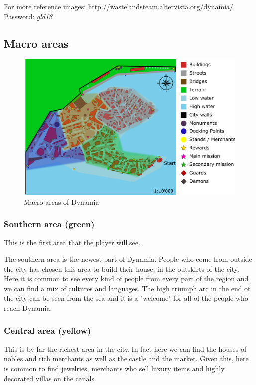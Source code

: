 For more reference images: \url{http://wastelandsteam.altervista.org/dynamia/}\\
Password: \textit{gld18}


\subsection{Macro areas}
\begin{figure}[H]
  \centering
  \includegraphics[width=\textwidth]{Images/Maps/dynamiaAreas}
  \caption{Macro areas of Dynamia}
\end{figure}

\subsubsection{Southern area (green)}
This is the first area that the player will see.

The southern area is the newest part of Dynamia. People who come from outside the city has chosen this area to build their house, in the outskirts of the city. Here it is common to see every kind of people from every part of the region and we can find a mix of cultures and languages. The high triumph arc in the end of the city can be seen from the sea and it is a "welcome" for all of the people who reach Dynamia.

\subsubsection{Central area (yellow)}
This is by far the richest area in the city. In fact here we can find the houses of  nobles and rich merchants as well as the castle and the market. Given this, here is common to find jewelries, merchants who sell luxury items and highly decorated villas on the canals.

